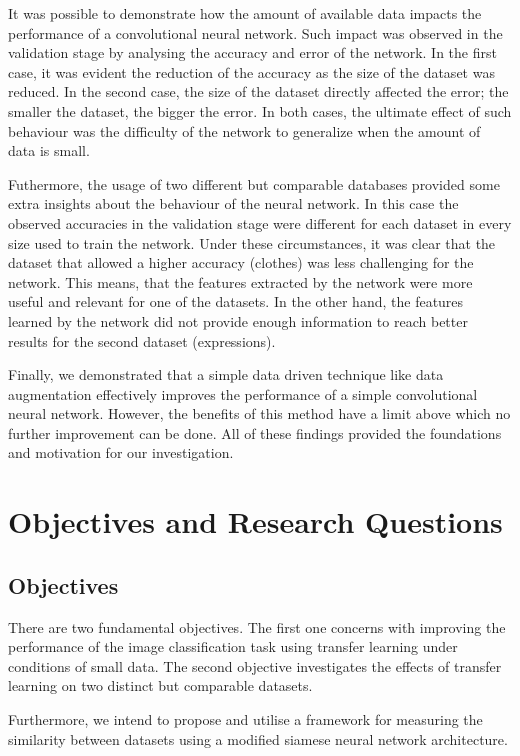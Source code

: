 \documentclass{article}
\begin{document}
It was possible to demonstrate how the amount of available data impacts the performance of a convolutional neural network. Such impact was observed in the validation stage by analysing the accuracy and error of the network. In the first case, it was evident the reduction of the accuracy as the size of the dataset was reduced. In the second case, the size of the dataset directly affected the error; the smaller the dataset, the bigger the error. In both cases, the ultimate effect of such behaviour was the difficulty of the network to generalize when the amount of data is small.

Futhermore, the usage of two different but comparable databases provided some extra insights about the behaviour of the neural network. In this case the observed accuracies in the validation stage were different for each dataset in every size used to train the network. Under these circumstances, it was clear that the dataset that allowed a higher accuracy (clothes) was less challenging for the network. This means, that the features extracted by the network were more useful and relevant for one of the datasets. In the other hand, the features learned by the network did not provide enough information to reach better results for the second dataset (expressions).

Finally, we demonstrated that a simple data driven technique like data augmentation effectively improves the performance of a simple convolutional neural network. However, the benefits of this method have a limit above which no further improvement can be done. All of these findings provided the foundations and motivation for our investigation.

\section{Objectives and Research Questions}
\label{sec:obj_questions}

\subsection{Objectives}
\label{sec:objectives}

There are two fundamental objectives. The first one concerns with improving the performance of the image classification task using transfer learning under conditions of small data. The second objective investigates the effects of transfer learning on two distinct but comparable datasets. 

Furthermore, we intend to propose and utilise a framework for measuring the similarity between datasets using a modified siamese neural network \cite{koch} architecture.
\end{document}
